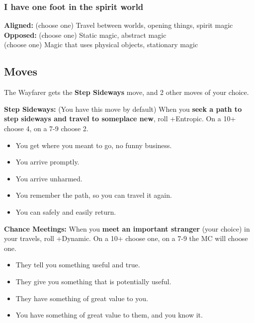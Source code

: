 \documentclass[
]{memoir}
\begin{document}
\hypertarget{i-have-one-foot-in-the-spirit-world}{%
\subsubsection{I have one foot in the spirit
world}\label{i-have-one-foot-in-the-spirit-world}}

\textbf{Aligned:} (choose one) Travel between worlds, opening things,
spirit magic\\
\textbf{Opposed:} (choose one) Static magic, abstract magic\\
(choose one) Magic that uses physical objects, stationary magic

\hypertarget{moves-8}{%
\subsection{Moves}\label{moves-8}}

The Wayfarer gets the \textbf{Step Sideways} move, and 2 other moves of
your choice.

\textbf{Step Sideways:} (You have this move by default) When you
\textbf{seek a path to step sideways and travel to someplace new}, roll
+Entropic. On a 10+ choose 4, on a 7-9 choose 2.

\begin{itemize}
\tightlist
\item
  You get where you meant to go, no funny business.
\item
  You arrive promptly.
\item
  You arrive unharmed.
\item
  You remember the path, so you can travel it again.
\item
  You can safely and easily return.
\end{itemize}

\textbf{Chance Meetings:} When you \textbf{meet an important stranger}
(your choice) in your travels, roll +Dynamic. On a 10+ choose one, on a
7-9 the MC will choose one.

\begin{itemize}
\tightlist
\item
  They tell you something useful and true.
\item
  They give you something that is potentially useful.
\item
  They have something of great value to you.
\item
  You have something of great value to them, and you know it.
\end{itemize}
\end{document}
